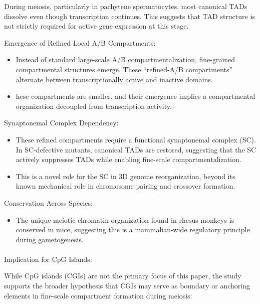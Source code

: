 \documentclass[
  a4paper,
  openany]{scrbook}
\makeatletter
\let\oldparagraph\paragraph
\renewcommand{\paragraph}{
    \@ifstar
      \xxxParagraphStar
      \xxxParagraphNoStar
  }
\newcommand{\xxxParagraphStar}[1]{\oldparagraph*{#1}\mbox{}}
\newcommand{\xxxParagraphNoStar}[1]{\oldparagraph{#1}\mbox{}}
\providecommand{\tightlist}{%
  \setlength{\itemsep}{0pt}\setlength{\parskip}{0pt}}
\makeatother
\begin{document}
During meiosis, particularly in pachytene spermatocytes, most canonical
TADs dissolve even though transcription continues. This suggests that
TAD structure is not strictly required for active gene expression at
this stage.

Emergence of Refined Local A/B Compartments:

\begin{itemize}
\item
  Instead of standard large-scale A/B compartmentalization, fine-grained
  compartmental structures emerge. These ``refined-A/B compartments''
  alternate between transcriptionally active and inactive domains.
\item
  hese compartments are smaller, and their emergence implies a
  compartmental organization decoupled from transcription activity.-
\end{itemize}

Synaptonemal Complex Dependency:

\begin{itemize}
\item
  These refined compartments require a functional synaptonemal complex
  (SC). In SC-defective mutants, canonical TADs are restored, suggesting
  that the SC actively suppresses TADs while enabling fine-scale
  compartmentalization.
\item
  This is a novel role for the SC in 3D genome reorganization, beyond
  its known mechanical role in chromosome pairing and crossover
  formation.
\end{itemize}

Conservation Across Species:

\begin{itemize}
\tightlist
\item
  The unique meiotic chromatin organization found in rhesus monkeys is
  conserved in mice, suggesting this is a mammalian-wide regulatory
  principle during gametogenesis.
\end{itemize}

\paragraph{Implication for CpG
Islands:}\label{implication-for-cpg-islands}

While CpG islands (CGIs) are not the primary focus of this paper, the
study supports the broader hypothesis that CGIs may serve as boundary or
anchoring elements in fine-scale compartment formation during meiosis:
\end{document}
